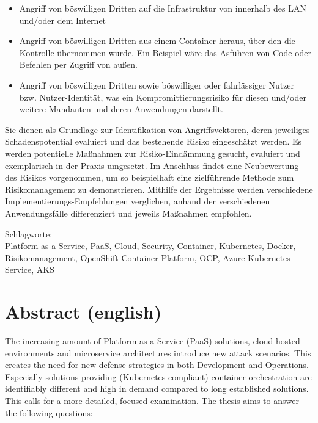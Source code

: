 \begin{itemize}

\item Angriff von böswilligen Dritten auf die Infrastruktur von innerhalb des LAN und/oder dem Internet

\item Angriff von böswilligen Dritten aus einem Container heraus, über den die Kontrolle übernommen wurde. Ein Beispiel wäre das Asführen von Code oder Befehlen per Zugriff von außen.

\item Angriff von böswilligen Dritten sowie böswilliger oder fahrlässiger Nutzer bzw. Nutzer-Identität, was ein Kompromittierungsrisiko für diesen und/oder weitere Mandanten und deren Anwendungen darstellt.

\end{itemize}

Sie dienen als Grundlage zur Identifikation von Angriffsvektoren, deren jeweiliges Schadenspotential evaluiert und das bestehende Risiko eingeschätzt werden.
Es werden potentielle Maßnahmen zur Risiko-Eindämmung gesucht, evaluiert und exemplarisch in der Praxis umgesetzt.
Im Anschluss findet eine Neubewertung des Risikos vorgenommen, um so beispielhaft eine zielführende Methode zum Risikomanagement zu demonstrieren.
Mithilfe der Ergebnisse werden verschiedene Implementierungs-Empfehlungen verglichen, anhand der verschiedenen Anwendungsfälle differenziert und jeweils Maßnahmen empfohlen.

\bigskip

\noindent
Schlagworte: \\
Platform-as-a-Service, PaaS, Cloud, Security, Container, Kubernetes, Docker, Risikomanagement, OpenShift Container Platform, OCP, Azure Kubernetes Service, AKS

\chapter*{Abstract (english)}
\thispagestyle{empty}

The increasing amount of Platform-as-a-Service (PaaS) solutions, cloud-hosted environments and microservice architectures introduce new attack scenarios. 
This creates the need for new defense strategies in both Development and Operations. 
Especially solutions providing (Kubernetes compliant) container orchestration are identifiably different and high in demand compared to long established solutions. 
This calls for a more detailed, focused examination. 
The thesis aims to answer the following questions:

